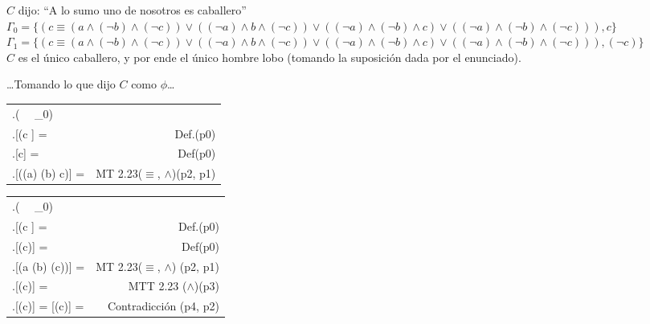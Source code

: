 \documentclass{article}
\newcommand{\q}[1]{``#1''}
\newcommand{\val}[2]{\mathbf{#1}[#2]}
\newlength{\logicv}
\newenvironment{logicenv}[2][0]{
  \begin{tcolorbox}[demo, title = #2]
  \vspace*{#1\logicv}
}{
  \end{tcolorbox}
  \vspace*{-.5cm}
}
\newenvironment{subproofill}[1][0]{
  \begin{tcolorbox}[demo, title = ]
    \vspace*{-#1\logicv}
}{
  \end{tcolorbox}
  \vspace*{-.5cm}
}
\newenvironment{subproof}[2][0]{
  \begin{tcolorbox}[demo, title = #2, colframe = black]
  \vspace*{#1\logicv}
  \begin{logic}
}{
  \end{logic}
  \end{tcolorbox}
}
\newenvironment{logic}{
    \setlength{\extrarowheight}{3pt}
    \setcounter{row}{-1}
    \begin{center}
    \begin{NiceTabular}{>{\stepcounter{row}\therow.\hspace*{5pt}} L r }
}{
    \end{NiceTabular}
    \end{center}
}
\begin{document}
\begin{logicenv}[5]{Punto 23}
  $C$ dijo: \q{A lo sumo uno de nosotros es caballero}\\
  $\Gamma_0 = \{(c \equiv (a \land (\neg b) \land (\neg c)) \lor ((\neg a) \land b \land (\neg c)) \lor ((\neg a) \land (\neg b) \land c) \lor ((\neg a) \land (\neg b) \land (\neg c))), c\}$\\
  $\Gamma_1 = \{(c \equiv (a \land (\neg b) \land (\neg c)) \lor ((\neg a) \land b \land (\neg c)) \lor ((\neg a) \land (\neg b) \land c) \lor ((\neg a) \land (\neg b) \land (\neg c))), (\neg c)\}$
  \makebox[16.5cm]{\hrulefill}\\
  $C$ es el único caballero, y por ende el único hombre lobo (tomando la suposición dada por el enunciado).
\end{logicenv}
\begin{subproofill}
  \dots Tomando lo que dijo $C$ como $\phi$\dots
  \begin{subproof}[5]{Con $\Gamma_0$}
    (\exists {} \, \vert\,   \Gamma_0)\\
    \val{v}{(c \equiv \phi} =  & Def.(p0)\\
    \val{v}{c} =  & Def(p0)\\
    \val{v}{((\neg a) \land (\neg b) \land c)} =  & MT 2.23($\equiv$, $\land$)(p2, p1)\\
  \end{subproof}
\end{subproofill}
\begin{subproofill}
  \begin{subproof}[5]{Con $\Gamma_1$}
    (\exists {} \, \vert\,   \Gamma_0)\\
    \val{v}{(c \equiv \phi} =  & Def.(p0)\\
    \val{v}{(\neg c)} =  & Def(p0)\\
    \val{v}{(a \land (\neg b) \land (\neg c))} =  & MT 2.23($\equiv$, $\land$) (p2, p1)\\
    \val{v}{(\neg c)} =  & MTT 2.23 ($\land$)(p3)\\ 
    \val{v}{(\neg c)} =   \val{v}{(\neg c)} =  & Contradicción (p4, p2)
  \end{subproof} 
\end{subproofill}
\end{document}
